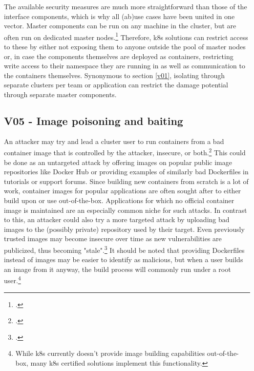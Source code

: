 The available security measures are much more straightforward than those of the interface components, which is why all (ab)use cases have been united in one vector.
Master components can be run on any machine in the cluster, but are often run on dedicated master nodes.\footcite[][, section 'Master Components']{k8sComponents}
Therefore, \gls{k8s} solutions can restrict access to these by either not exposing them to anyone outside the pool of master nodes or, in case the components themselves are deployed as containers, restricting write access to their namespace they are running in as well as communication to the containers themselves.
Synonymous to section \ref{v01}, isolating through separate clusters per team or application can restrict the damage potential through separate master components.

\subsection{V05 - Image poisoning and baiting}
An attacker may try and lead a cluster user to run containers from a bad container image that is controlled by the attacker, insecure, or both.\footcite[][, p. 13 to 14]{nistK8s}
This could be done as an untargeted attack by offering images on popular public image repositories like Docker Hub or providing examples of similarly bad Dockerfiles in tutorials or support forums.
Since building new containers from scratch is a lot of work, container images for popular applications are often sought after to either build upon or use out-of-the-box.
Applications for which no official container image is maintained are an especially common niche for such attacks.
In contrast to this, an attacker could also try a more targeted attack by uploading bad images to the (possibly private) repository used by their target.
Even previously trusted images may become insecure over time as new vulnerabilities are publicized, thus becoming "stale".\footcite[][, p. 14]{nistK8s}
It should be noted that providing Dockerfiles instead of images may be easier to identify as malicious, but when a user builds an image from it anyway, the build process will commonly run under a root user.\footnote{While \gls{k8s} currently doesn't provide image building capabilities out-of-the-box, many \gls{k8s} certified solutions implement this functionality.}

